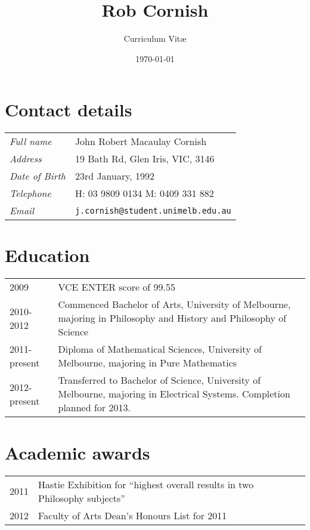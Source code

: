 \documentclass[12pt,a4paper]{article}
\title{\bfseries \huge Rob Cornish}
\author{Curriculum Vit\ae}
\date{\today}
\newenvironment{llist}
	{\renewcommand{\arraystretch}{1.5}\begin{tabular}{p{3cm} p{12cm}}}
	{\end{tabular}}
\begin{document}
\maketitle

\thispagestyle{empty}
\vspace{-3em}

\section*{Contact details}
\begin{llist}
	\textit{Full name} & John Robert Macaulay Cornish \\
	\textit{Address} & 19 Bath Rd, Glen Iris, VIC, 3146 \\
	\textit{Date of Birth} & 23rd January, 1992 \\
	\textit{Telephone} & H: 03 9809 0134 \newline M: 0409 331 882 \\
	\textit{Email} & \texttt{j.cornish@student.unimelb.edu.au}
\end{llist}

\section*{Education}
\begin{llist}
	2009 & VCE ENTER score of 99.55 \\
	2010-2012 & Commenced Bachelor of Arts, University of Melbourne, majoring in Philosophy and History and Philosophy of Science \\
	2011-present & Diploma of Mathematical Sciences, University of Melbourne, majoring in Pure Mathematics \\
	2012-present & Transferred to Bachelor of Science, University of Melbourne, majoring in Electrical Systems. Completion planned for 2013. \\
\end{llist}

\section*{Academic awards}
\begin{llist}
	2011 & Hastie Exhibition for ``highest overall results in two Philosophy subjects'' \\
	2012 & Faculty of Arts Dean's Honours List for 2011
\end{llist}
\end{document}
